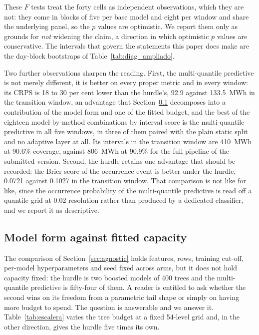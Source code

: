 \documentclass[preprint,3p,times]{elsarticle}
\providecommand{\DIFaddtex}[1]{{\protect\color{blue} \sf #1}} %
\providecommand{\DIFadd}[1]{\texorpdfstring{\DIFaddtex{#1}}{#1}} %
\begin{document}
\DIFadd{These $F$ tests treat the forty cells as independent observations, which they are not: they come in blocks of five per base model and eight per window and share the underlying panel, so the $p$ values are optimistic. We report them only as grounds for \emph{not} widening the claim, a direction in which optimistic $p$ values are conservative. The intervals that govern the statements this paper does make are the day-block bootstraps of Table~\ref{tab:diag_ampliado}.
}

\DIFadd{Two further observations sharpen the reading. First, the multi-quantile predictive is not merely different, it is better on every proper metric and in every window: its CRPS is 18 to 30 per cent lower than the hurdle's, 92.9 against 133.5~MWh in the transition window, an advantage that Section~\ref{sec:escalera} decomposes into a contribution of the model form and one of the fitted budget, and the best of the eighteen model-by-method combinations by interval score is the multi-quantile predictive in all five windows, in three of them paired with the plain static split and no adaptive layer at all. Its intervals in the transition window are 410~MWh at 90.6\% coverage, against 806~MWh at 90.9\% for the full pipeline of the submitted version. Second, the hurdle retains one advantage that should be recorded: the Brier score of the occurrence event is better under the hurdle, 0.0721 against 0.1027 in the transition window. That comparison is not like for like, since the occurrence probability of the multi-quantile predictive is read off a quantile grid at 0.02 resolution rather than produced by a dedicated classifier, and we report it as descriptive.
}

\subsection{Model form against fitted capacity}
\label{sec:escalera}

\DIFadd{The comparison of Section~\ref{sec:agnostic} holds features, rows, training cut-off, per-model hyperparameters and seed fixed across arms, but it does not hold capacity fixed: the hurdle is two boosted models of 400 trees and the multi-quantile predictive is fifty-four of them. A reader is entitled to ask whether the second wins on its freedom from a parametric tail shape or simply on having more budget to spend. The question is answerable and we answer it. Table~\ref{tab:escalera} varies the tree budget at a fixed 54-level grid and, in the other direction, gives the hurdle five times its own.
}
\end{document}
